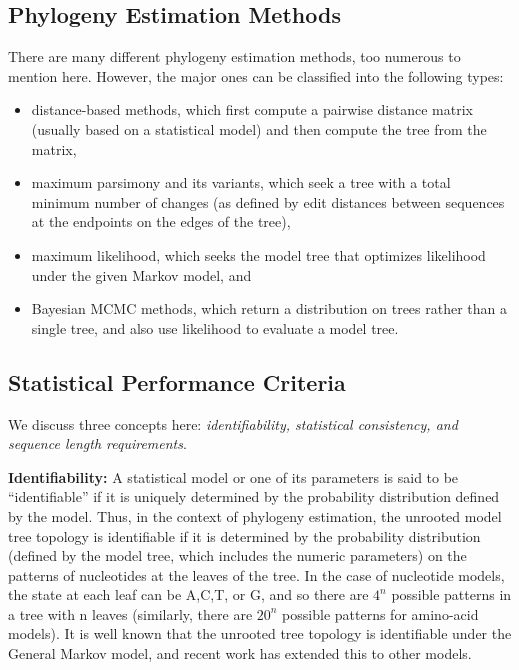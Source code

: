 \subsection{Phylogeny Estimation Methods}
There are many different phylogeny estimation methods, too numerous to mention here.
However, the major ones can be classified into the following types:

\begin{itemize}
	\item distance-based methods, which first compute a pairwise distance matrix (usually
based on a statistical model) and then compute the tree from the matrix,
	\item maximum parsimony and its variants, which seek a tree with a total minimum
number of changes (as defined by edit distances between sequences at the endpoints
on the edges of the tree),
	\item maximum likelihood, which seeks the model tree that optimizes likelihood
under the given Markov model, and
	\item Bayesian MCMC methods, which return a distribution on trees rather than a single
tree, and also use likelihood to evaluate a model tree.	
\end{itemize}

\subsection{Statistical Performance Criteria}
We discuss three concepts here: \textit{identifiability, statistical consistency, 
and sequence length requirements}.


\textbf{Identifiability:} A statistical model or one of its parameters is said to be 
``identifiable'' if it is uniquely determined by the probability distribution 
defined by the model. Thus, in the context of phylogeny estimation, the 
unrooted model tree topology is identifiable if it is determined by the 
probability distribution (defined by the model tree, which includes the 
numeric parameters) on the patterns of nucleotides at the leaves of the tree. 
In the case of nucleotide models, the state at each leaf can be A,C,T, or G, 
and so there are $4^n$ possible patterns in a tree with n leaves 
(similarly, there are $20^n$ possible patterns for amino-acid models). 
It is well known that the unrooted tree topology is identifiable under 
the General Markov model, and recent work has extended this to 
other models.


